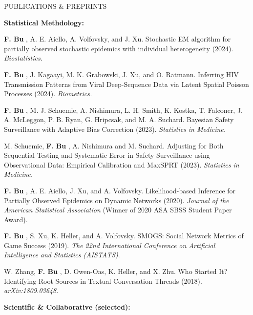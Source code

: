 \documentclass{resume} %
\newcommand{\myName}[1]{
	\textbf{#1}
}
\begin{document}
\begin{rSection}{PUBLICATIONS \& PREPRINTS}

\hspace{-.2in} \textbf{Statistical Methdology:}

\myName{F. Bu}, A. E. Aiello, A. Volfovsky, and J. Xu.  
Stochastic EM algorithm for partially observed stochastic epidemics with individual heterogeneity (2024).  \emph{Biostatistics}.%

\myName{F. Bu}, J. Kagaayi, M. K. Grabowski, J. Xu, and O. Ratmann.
Inferring HIV Transmission Patterns from Viral Deep-Sequence Data via Latent Spatial Poisson Processes (2024). \emph{Biometrics.} 


\myName{F. Bu}, M. J. Schuemie,  A. Nishimura, L. H. Smith, K. Kostka, T. Falconer, J. A. McLeggon, P. B. Ryan, G. Hripcsak, and M. A. Suchard.
Bayesian Safety Surveillance with Adaptive Bias Correction (2023). \emph{Statistics in Medicine.} %


M. Schuemie, \myName{F. Bu}, A. Nishimura and M. Suchard.
Adjusting for Both Sequential Testing and Systematic Error in Safety Surveillance using Observational Data: Empirical Calibration and MaxSPRT (2023). \emph{Statistics in Medicine.}



\myName{F. Bu}, A. E. Aiello, J. Xu, and A. Volfovsky. 
Likelihood-based Inference for Partially Observed Epidemics on Dynamic Networks (2020). \emph{Journal of the American Statistical Association} (Winner of 2020 ASA SBSS Student Paper Award). %


\myName{F. Bu}, S. Xu, K. Heller, and A. Volfovsky. 
SMOGS: Social Network Metrics of Game Success (2019). \emph{The 22nd International Conference on Artificial Intelligence and Statistics (AISTATS)}. %


W. Zhang, \myName{F. Bu}, D. Owen-Oas, K. Heller, and X. Zhu. 
Who Started It? Identifying Root Sources in Textual Conversation Threads (2018). \emph{arXiv:1809.03648}.

\medskip

\hspace{-.2in} \textbf{Scientific \& Collaborative (selected): }


\end{rSection}
\end{document}
